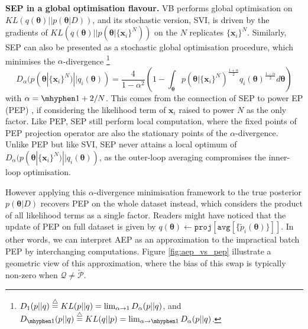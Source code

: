 %
\textbf{SEP in a global optimisation flavour.}
VB performs global optimisation on $KL(q(\bm{\theta})||p(\bm{\theta}|D))$, and its stochastic version, SVI, is driven by the gradients of $KL(q(\bm{\theta}) || p(\bm{\theta} | \{\bm{x}_i\}^N))$ on the $N$ replicates $\{\bm{x}_i\}^N$. Similarly, SEP can also be presented as a stochastic global optimisation procedure, which minimises the $\alpha$-divergence \footnote{$D_{1}(p||q) \buildrel\triangle\over = KL(p || q) = \lim_{\alpha \rightarrow 1} D_{\alpha}(p||q)$, and $D_{ \mhyphen 1}(p||q) \buildrel\triangle\over = KL(q || p) = \lim_{\alpha \rightarrow \mhyphen 1} D_{\alpha}(p || q)$. } \cite{amari:ig1985}
\begin{equation}
D_{\alpha}(p(\bm{\theta} | \{\bm{x}_i\}^N) || q_i(\bm{\theta})) = \frac{4}{1 - \alpha^2} 
		\left( 1 - \int_{\bm{\theta}} p(\bm{\theta} | \{\bm{x}_i\}^N)^{\frac{1+\alpha}{2}} q_i(\bm{\theta})^{\frac{1-\alpha}{2}} d\bm{\theta} \right)
\end{equation} 
with $\alpha = \mhyphen 1 + 2/N$. This comes from the connection of SEP to power EP (PEP) \cite{minka:powerep}, if considering the likelihood term of $\bm{x}_i$ raised to power $N$ as the only factor. Like PEP, SEP still perform local computation, where the fixed points of PEP projection operator are also the stationary points of the $\alpha$-divergence. Unlike PEP but like SVI, SEP never attains a local optimum of $D_{\alpha}(p(\bm{\theta} | \{\bm{x}_i\}^N) || q_i(\bm{\theta}))$, as the outer-loop averaging compromises the inner-loop optimisation.

%
However applying this $\alpha$-divergence minimisation framework to the true posterior $p(\bm{\theta}|D)$ recovers PEP on the whole dataset instead, which considers the product of all likelihood terms as a single factor. Readers might have noticed that the update of PEP on full dataset is given by $q(\bm{\theta}) \leftarrow \mathtt{proj}[\mathtt{avg}[\{ \tilde{p}_i(\bm{\theta}) \}]]$. In other words, we can interpret AEP as an approximation to the impractical batch PEP by interchanging computations. Figure \ref{fig:aep_vs_pep} illustrate a geometric view of this approximation, where the bias of this swap is typically non-zero when $\mathcal{Q} \neq \tilde{\mathcal{P}}$.


